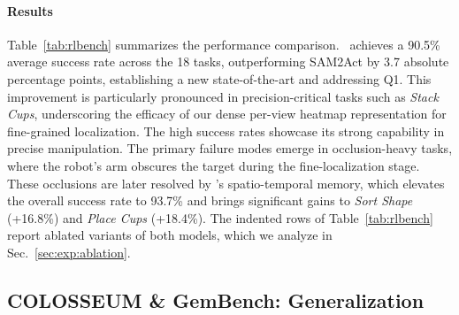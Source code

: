 \paragraph{Results} 
Table~\ref{tab:rlbench} summarizes the performance comparison. \method\ achieves a 90.5\% average success rate across the 18 tasks, outperforming SAM2Act by 3.7 absolute percentage points, establishing a new state-of-the-art and addressing Q1.
This improvement is particularly pronounced in precision-critical tasks such as \emph{Stack Cups}, underscoring the efficacy of our dense per-view heatmap representation for fine-grained localization. The high success rates showcase its strong capability in precise manipulation. 
The primary failure modes emerge in occlusion-heavy tasks, where the robot's arm obscures the target during the fine-localization stage.
These occlusions are later resolved by \memmethod's spatio-temporal memory, which elevates the overall success rate to 93.7\% and brings significant gains to \emph{Sort Shape} (+16.8\%) and \emph{Place Cups} (+18.4\%).
The indented rows of Table~\ref{tab:rlbench} report ablated variants of both models, which we analyze in Sec.~\ref{sec:exp:ablation}.


\subsection{COLOSSEUM \& GemBench: Generalization}
\label{sec:exp:additional}

